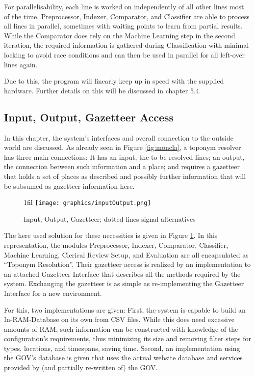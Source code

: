\documentclass[11pt]{article}
\makeatletter
\newcommand*{\centerfloat}{
  \parindent \z@
  \leftskip \z@ \@plus 1fil \@minus \textwidth
  \rightskip\leftskip
  \parfillskip \z@skip}
\makeatother
\begin{document}
For parallelisability, each line is worked on independently of all other lines most of the time. Preprocessor, Indexer, Comparator, and Classifier are able to process all lines in parallel, sometimes with waiting points to learn from partial results. While the Comparator does rely on the Machine Learning step in the second iteration, the required information is gathered during Classification with minimal locking to avoid race conditions and can then be used in parallel for all left-over lines again.

Due to this, the program will linearly keep up in speed with the supplied hardware. Further details on this will be discussed in chapter 5.4.

\newpage
\subsection{Input, Output, Gazetteer Access}

In this chapter, the system's interfaces and overall connection to the outside world are discussed. As already seen in Figure \ref{fig:moncla}, a toponym resolver has three main connections: It has an input, the to-be-resolved lines; an output, the connection between such information and a place; and requires a gazetteer that holds a set of places as described and possibly further information that will be subsumed as gazetteer information here.

\begin{figure}[htb!]
  \centerfloat
    \texttt{[image: graphics/inputOutput.png]}
  \caption{Input, Output, Gazetteer; dotted lines signal alternatives}
  \label{fig:inputOutput}
\end{figure}

The here used solution for these necessities is given in Figure \ref{fig:inputOutput}. In this representation, the modules Preprocessor, Indexer, Comparator, Classifier, Machine Learning, Clerical Review Setup, and Evaluation are all encapsulated as ``Toponym Resolution''. Their gazetteer access is realized by an implementation to an attached Gazetteer Interface that describes all the methods required by the system. Exchanging the gazetteer is as simple as re-implementing the Gazetteer Interface for a new environment.

For this, two implementations are given: First, the system is capable to build an In-RAM-Database on its own from CSV files. While this does need excessive amounts of RAM, such information can be constructed with knowledge of the configuration's requirements, thus minimizing its size and removing filter steps for types, locations, and timespans, saving time. Second, an implementation using the GOV's database is given that uses the actual website database and services provided by (and partially re-written of) the GOV.\\
\end{document}

